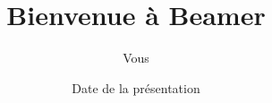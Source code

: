 \documentclass{beamer}
\title{Bienvenue à Beamer}
\author{Vous}
\institute{D'où vous venez}
\date{Date de la présentation}
\begin{document}
\begin{frame}
\titlepage %
\end{frame}
\end{document}
